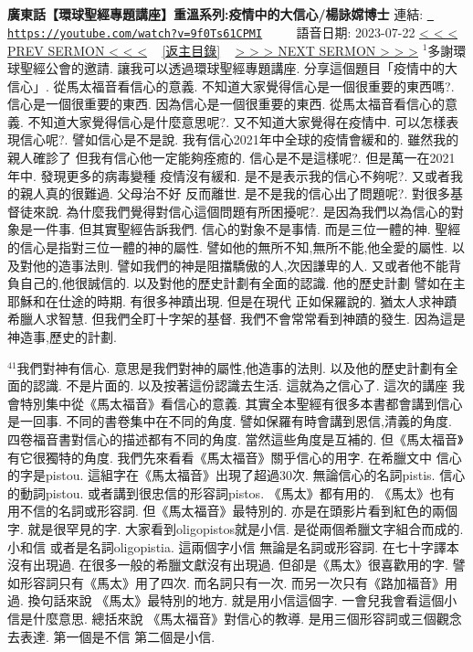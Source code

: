 \documentclass{book}
\begin{document}
\section{}
\label{sec:9f0Ts61CPMI}
\textbf{廣東話【環球聖經專題講座】重溫系列:疫情中的大信心/楊詠嫦博士}
\newline
\newline
連結: \href{https://youtube.com/watch?v=9f0Ts61CPMI}{\texttt{ https://youtube.com/watch?v=9f0Ts61CPMI}} ~~~~ 語音日期: 2023-07-22 
\newline
\newline
\hyperref[sec:o_naHdmPOsI]{\small{< < < PREV SERMON < < <}}
~
\hyperref[sec:index]{\small{[返主目錄]}}
~
\hyperref[sec:z2aRisPP3Ug]{\small{> > > NEXT SERMON > > >}}
\newline
\newline
$^{1}$多謝環球聖經公會的邀請.
讓我可以透過環球聖經專題講座.
分享這個題目「疫情中的大信心」.
從馬太福音看信心的意義.
不知道大家覺得信心是一個很重要的東西嗎?.
信心是一個很重要的東西.
因為信心是一個很重要的東西.
從馬太福音看信心的意義.
不知道大家覺得信心是什麼意思呢?.
又不知道大家覺得在疫情中.
可以怎樣表現信心呢?.
譬如信心是不是說.
我有信心2021年中全球的疫情會緩和的.
雖然我的親人確診了 但我有信心他一定能夠痊癒的.
信心是不是這樣呢?.
但是萬一在2021年中.
發現更多的病毒變種 疫情沒有緩和.
是不是表示我的信心不夠呢?.
又或者我的親人真的很難過.
父母治不好 反而離世.
是不是我的信心出了問題呢?.
對很多基督徒來說.
為什麼我們覺得對信心這個問題有所困擾呢?.
是因為我們以為信心的對象是一件事.
但其實聖經告訴我們.
信心的對象不是事情.
而是三位一體的神.
聖經的信心是指對三位一體的神的屬性.
譬如他的無所不知,無所不能,他全愛的屬性.
以及對他的造事法則.
譬如我們的神是阻擋驕傲的人,次因謙卑的人.
又或者他不能背負自己的,他很誠信的.
以及對他的歷史計劃有全面的認識.
他的歷史計劃 譬如在主耶穌和在仕途的時期.
有很多神蹟出現.
但是在現代 正如保羅說的.
猶太人求神蹟 希臘人求智慧.
但我們全盯十字架的基督.
我們不會常常看到神蹟的發生.
因為這是神造事,歷史的計劃.

$^{41}$我們對神有信心.
意思是我們對神的屬性,他造事的法則.
以及他的歷史計劃有全面的認識.
不是片面的.
以及按著這份認識去生活.
這就為之信心了.
這次的講座 我會特別集中從《馬太福音》看信心的意義.
其實全本聖經有很多本書都會講到信心是一回事.
不同的書卷集中在不同的角度.
譬如保羅有時會講到恩信,清義的角度.
四卷福音書對信心的描述都有不同的角度.
當然這些角度是互補的.
但《馬太福音》有它很獨特的角度.
我們先來看看《馬太福音》關乎信心的用字.
在希臘文中 信心的字是pistou.
這組字在《馬太福音》出現了超過30次.
無論信心的名詞pistis.
信心的動詞pistou.
或者講到很忠信的形容詞pistos.
《馬太》都有用的.
《馬太》也有用不信的名詞或形容詞.
但《馬太福音》最特別的.
亦是在頭影片看到紅色的兩個字.
就是很罕見的字.
大家看到oligopistos就是小信.
是從兩個希臘文字組合而成的.
小和信 或者是名詞oligopistia.
這兩個字小信 無論是名詞或形容詞.
在七十字譯本沒有出現過.
在很多一般的希臘文獻沒有出現過.
但卻是《馬太》很喜歡用的字.
譬如形容詞只有《馬太》用了四次.
而名詞只有一次.
而另一次只有《路加福音》用過.
換句話來說 《馬太》最特別的地方.
就是用小信這個字.
一會兒我會看這個小信是什麼意思.
總括來說 《馬太福音》對信心的教導.
是用三個形容詞或三個觀念去表達.
第一個是不信 第二個是小信.
\end{document}
